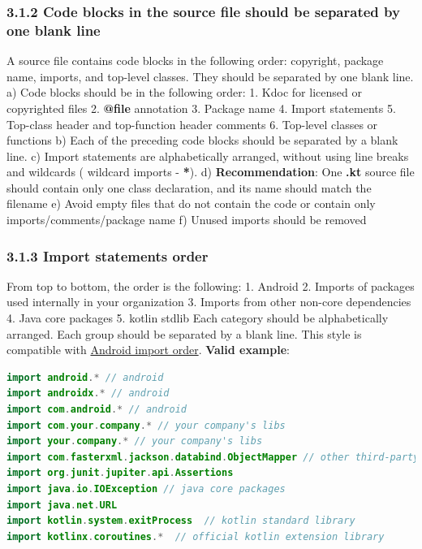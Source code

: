 \subsubsection*{\textbf{3.1.2 Code blocks in the source file should be separated by one blank line}}
\leavevmode\newline
\label{sec:3.1.2}
A source file contains code blocks in the following order: copyright, package name, imports, and top-level classes. They should be separated by one blank line.
a) Code blocks should be in the following order:
1.	Kdoc for licensed or copyrighted files
2.	\textbf{@file} annotation
3.	Package name
4.	Import statements
5.	Top-class header and top-function header comments
6.	Top-level classes or functions
b) Each of the preceding code blocks should be separated by a blank line.
c) Import statements are alphabetically arranged, without using line breaks and wildcards ( wildcard imports - \textbf{*}).
d) \textbf{Recommendation}: One \textbf{.kt} source file should contain only one class declaration, and its name should match the filename
e) Avoid empty files that do not contain the code or contain only imports/comments/package name
f) Unused imports should be removed
\subsubsection*{\textbf{3.1.3 Import statements order}}
\leavevmode\newline
\label{sec:3.1.3}
From top to bottom, the order is the following:
1. Android
2. Imports of packages used internally in your organization
3. Imports from other non-core dependencies
4. Java core packages
5. kotlin stdlib
Each category should be alphabetically arranged. Each group should be separated by a blank line. This style is compatible with  \href{https://source.android.com/setup/contribute/code-style#order-import-statements}{Android import order}.
\textbf{Valid example}:
\begin{lstlisting}[language=Kotlin]
import android.* // android
import androidx.* // android
import com.android.* // android
import com.your.company.* // your company's libs
import your.company.* // your company's libs
import com.fasterxml.jackson.databind.ObjectMapper // other third-party dependencies
import org.junit.jupiter.api.Assertions
import java.io.IOException // java core packages
import java.net.URL
import kotlin.system.exitProcess  // kotlin standard library
import kotlinx.coroutines.*  // official kotlin extension library
\end{lstlisting}
